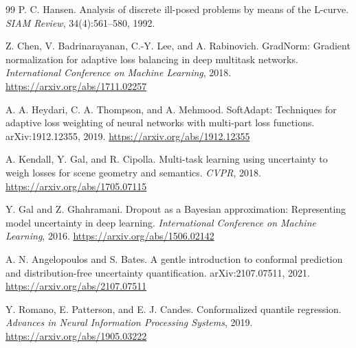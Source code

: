 \documentclass[11pt]{article}
\begin{document}
\begin{thebibliography}{99}
P. C. Hansen.
\newblock Analysis of discrete ill-posed problems by means of the L-curve.
\newblock \emph{SIAM Review}, 34(4):561--580, 1992.

Z. Chen, V. Badrinarayanan, C.-Y. Lee, and A. Rabinovich.
\newblock GradNorm: Gradient normalization for adaptive loss balancing in deep multitask networks.
\newblock \emph{International Conference on Machine Learning}, 2018.
\newblock \url{https://arxiv.org/abs/1711.02257}

A. A. Heydari, C. A. Thompson, and A. Mehmood.
\newblock SoftAdapt: Techniques for adaptive loss weighting of neural networks with multi-part loss functions.
\newblock arXiv:1912.12355, 2019.
\newblock \url{https://arxiv.org/abs/1912.12355}

A. Kendall, Y. Gal, and R. Cipolla.
\newblock Multi-task learning using uncertainty to weigh losses for scene geometry and semantics.
\newblock \emph{CVPR}, 2018.
\newblock \url{https://arxiv.org/abs/1705.07115}

Y. Gal and Z. Ghahramani.
\newblock Dropout as a Bayesian approximation: Representing model uncertainty in deep learning.
\newblock \emph{International Conference on Machine Learning}, 2016.
\newblock \url{https://arxiv.org/abs/1506.02142}

A. N. Angelopoulos and S. Bates.
\newblock A gentle introduction to conformal prediction and distribution-free uncertainty quantification.
\newblock arXiv:2107.07511, 2021.
\newblock \url{https://arxiv.org/abs/2107.07511}

Y. Romano, E. Patterson, and E. J. Candes.
\newblock Conformalized quantile regression.
\newblock \emph{Advances in Neural Information Processing Systems}, 2019.
\newblock \url{https://arxiv.org/abs/1905.03222}

\end{thebibliography}
\end{document}
